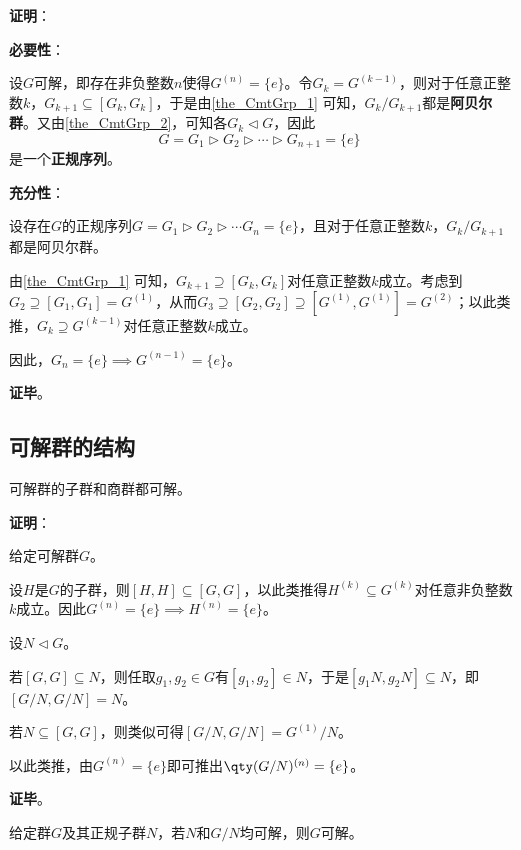 \textbf{证明}：

\textbf{必要性}：

设$G$可解，即存在非负整数$n$使得$G^{(n)}=\{e\}$。令$G_k=G^{(k-1)}$，则对于任意正整数$k$，$G_{k+1}\subseteq [G_k, G_k]$，于是由\autoref{the_CmtGrp_1} 可知，$G_k/G_{k+1}$都是\textbf{阿贝尔群}。又由\autoref{the_CmtGrp_2}，可知各$G_k\lhd G$，因此
\begin{equation}
G=G_1\rhd G_2\rhd\cdots\rhd G_{n+1}=\{e\}~
\end{equation}
是一个\textbf{正规序列}。

\textbf{充分性}：

设存在$G$的正规序列$G=G_1\rhd G_2\rhd\cdots G_n=\{e\}$，且对于任意正整数$k$，$G_k/G_{k+1}$都是阿贝尔群。

由\autoref{the_CmtGrp_1} 可知，$G_{k+1}\supseteq [G_k, G_k]$对任意正整数$k$成立。考虑到$G_2\supseteq[G_1, G_1]=G^{(1)}$，从而$G_3\supseteq[G_2, G_2]\supseteq [G^{(1)}, G^{(1)}]=G^{(2)}$；以此类推，$G_{k}\supseteq G^{(k-1)}$对任意正整数$k$成立。

因此，$G_n=\{e\}\implies G^{(n-1)}=\{e\}$。

\textbf{证毕}。




\subsection{可解群的结构}



\begin{lemma}{}
可解群的子群和商群都可解。
\end{lemma}



\textbf{证明}：

给定可解群$G$。

设$H$是$G$的子群，则$[H, H]\subseteq [G, G]$，以此类推得$H^{(k)}\subseteq G^{(k)}$对任意非负整数$k$成立。因此$G^{(n)}=\{e\}\implies H^{(n)}=\{e\}$。

设$N\lhd G$。

若$[G, G]\subseteq N$，则任取$g_1, g_2\in G$有$[g_1, g_2]\in N$，于是$[g_1N, g_2N]\subseteq N$，即$[G/N, G/N]=N$。

若$N\subseteq [G, G]$，则类似可得$[G/N, G/N]=G^{(1)}/N$。

以此类推，由$G^{(n)}=\{e\}$即可推出$\qty(G/N)^{(n)}=\{e\}$。


\textbf{证毕}。






\begin{lemma}{}
给定群$G$及其正规子群$N$，若$N$和$G/N$均可解，则$G$可解。
\end{lemma}


























